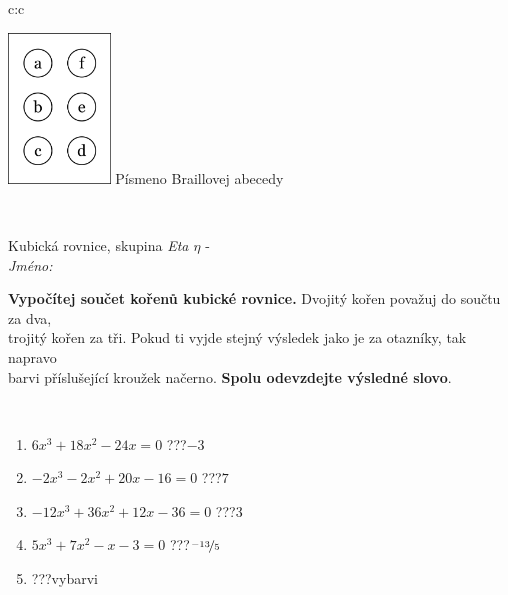 \documentclass[10pt]{report}
\begin{document}
\begin{tabular}{c:c}
\begin{minipage}[c][104.5mm][t]{0.5\linewidth}
\begin{center}
\begin{minipage}{0.20\linewidth}
\begin{center}
\includegraphics[height=40mm]{../images/braille.png}
{\small Písmeno Braillovej abecedy}
\end{center}
\end{minipage}
\end{center}
\end{minipage}
\\ \hdashline
\begin{minipage}[c][104.5mm][t]{0.5\linewidth}
\begin{center}
\vspace{7mm}
{\huge Kubická rovnice, skupina \textit{Eta $\eta$} -}\\[5mm]
\textit{Jméno:}\phantom{xxxxxxxxxxxxxxxxxxxxxxxxxxxxxxxxxxxxxxxxxxxxxxxxxxxxxxxxxxxxxxxxx}\\[5mm]
\begin{minipage}{0.95\linewidth}
\begin{center}
\textbf{Vypočítej součet kořenů kubické rovnice.} Dvojitý kořen považuj do součtu za dva,\\trojitý kořen za tři. Pokud ti vyjde stejný výsledek jako je za otazníky, tak napravo\\barvi příslušející kroužek načerno. \textbf{Spolu odevzdejte výsledné slovo}.
\end{center}
\end{minipage}
\\[1mm]
\begin{minipage}{0.79\linewidth}
\begin{center}
\begin{varwidth}{\linewidth}
\begin{enumerate}
\Large
\item $6x^3+18x^2-24x=0$\quad \dotfill\; ???\;\dotfill \quad $-3$
\item $-2x^3-2x^2+20x-16=0$\quad \dotfill\; ???\;\dotfill \quad $7$
\item $-12x^3+36x^2+12x-36=0$\quad \dotfill\; ???\;\dotfill \quad $3$
\item $5x^3+7x^2-x-3=0$\quad \dotfill\; ???\;\dotfill \quad $\nicefrac{-13}{5}$
\item \quad \dotfill\; ???\;\dotfill \quad vybarvi

\end{enumerate}
\end{varwidth}
\end{center}
\end{minipage}
\end{center}
\end{minipage}
\end{tabular}
\end{document}
